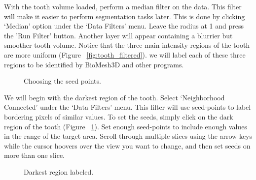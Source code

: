 \documentclass[fleqn,12pt,openany]{book}
\begin{document}
With the tooth volume loaded, perform a median filter on the data. This filter 
will make it easier to perform segmentation tasks later. This is done by 
clicking  `Median'  option under the `Data Filters' menu. Leave the radius 
at 1 and press the 'Run Filter' button. Another layer will appear containing a 
blurrier but smoother tooth volume. Notice that the three main intensity 
regions of the tooth are more uniform (Figure ~\ref{fig:tooth_filtered}).  
we will label each of these three regions to be identified by BioMesh3D 
and other programs.

\begin{figure}
\caption{\label{fig:tooth_seeds} Choosing the seed points.}
\end{figure} 

We will begin with the darkest region of the tooth. Select 
`Neighborhood Connected' under the `Data Filters' menu. This filter will 
use seed-points to label bordering pixels of similar values. To set the 
seeds, simply click on the dark region of the tooth 
(Figure ~\ref{fig:tooth_seeds}). Set enough seed-points to include 
enough values in the range of the target area. Scroll through multiple slices using
the arrow keys while the cursor hoovers over the view you want to change, and then 
 set seeds on more than one slice.

\begin{figure}
\caption{\label{fig:tooth_firstone} Darkest region labeled.}
\end{figure}
\end{document}
